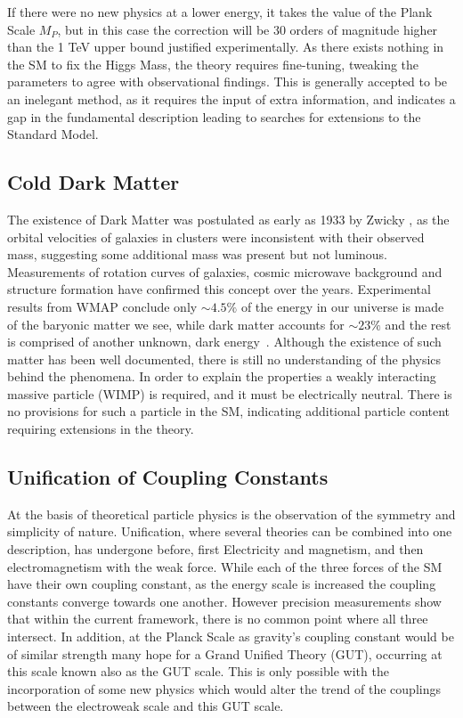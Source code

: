  If there were no new physics at a lower energy, it takes the value of the Plank Scale $M_{P}$, but in this case the correction will be 30 orders of magnitude higher than the 1 TeV upper bound justified experimentally\cite{Drees}. As there exists nothing in the SM to fix the Higgs Mass, the theory requires fine-tuning, tweaking the parameters to agree with observational findings. This is generally accepted to be an inelegant method, as it requires the input of extra information, and indicates a gap in the fundamental description leading to searches for extensions to the Standard Model. 

\subsection{Cold Dark Matter}

The existence of Dark Matter was postulated as early as 1933 by Zwicky \cite{zwicky}, as the orbital velocities of galaxies in clusters were inconsistent with their observed mass, suggesting some additional mass was present but not luminous.  Measurements of rotation curves of galaxies, cosmic microwave background and structure formation have confirmed this concept over the years. Experimental results from WMAP conclude only $\sim 4.5\%$ of the energy in our universe is made of the baryonic matter we see, while dark matter accounts for $\sim 23\%$ and the rest is comprised of another unknown, dark energy~\cite{WMAP5}. Although the existence of such matter has been well documented, there is still no understanding of the physics behind the phenomena. In order to explain the properties a weakly interacting massive particle (WIMP) is required, and it must be electrically neutral. There is no provisions for such a particle in the SM, indicating additional particle content requiring extensions in the theory. 

\subsection{Unification of Coupling Constants}

At the basis of theoretical particle physics is the observation of the symmetry and simplicity of nature. Unification, where several theories can be combined into one description,  has undergone before, first Electricity and magnetism, and then electromagnetism with the weak force. While each of the three forces of the SM have their own coupling constant, as the energy scale is increased the coupling constants converge towards one another. However precision measurements show that within the current framework,  there is no common point where all three intersect. In addition, at the Planck Scale as gravity's coupling constant would be of similar strength many hope for a Grand Unified Theory (GUT),  occurring at this scale known also as the GUT scale. This is only possible with the incorporation of some new physics which would alter the trend of the couplings between the electroweak scale and this GUT scale. 



